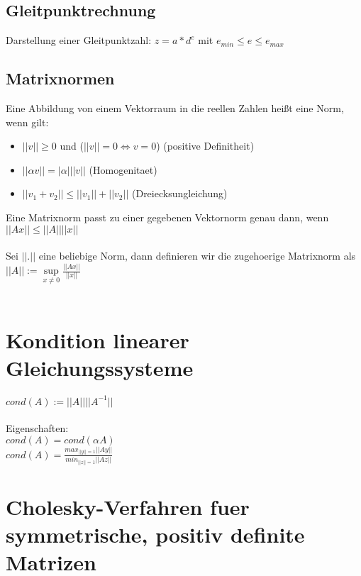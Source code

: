 \documentclass[a4paper]{scrreprt}
\begin{document}
\subsection{Gleitpunktrechnung}

Darstellung einer Gleitpunktzahl: $z = a * d^e$ mit $e_{min} \leq e \leq e_{max}$

\subsection{Matrixnormen}

Eine Abbildung von einem Vektorraum in die reellen Zahlen heißt eine Norm, wenn gilt:
\begin{itemize}
	\item $||v|| \geq 0$ und ($||v|| = 0 \Leftrightarrow v = 0$) (positive Definitheit)
	\item $||\alpha v|| = |\alpha|||v||$ (Homogenitaet)
	\item $||v_1 + v_2|| \leq ||v_1|| + ||v_2||$ (Dreiecksungleichung)
\end{itemize}

Eine Matrixnorm passt zu einer gegebenen Vektornorm genau dann, wenn\\
$||Ax|| \leq ||A||||x||$\\\\

Sei $||.||$ eine beliebige Norm, dann definieren wir die zugehoerige Matrixnorm als\\
$||A|| := \sup\limits_{x \neq 0}\frac{||Ax||}{||x||}$\\\\

\section{Kondition linearer Gleichungssysteme}

$cond(A) := ||A||||A^{-1}||$\\\\

Eigenschaften:\\
$cond(A) = cond(\alpha A)$\\
$cond(A) = \frac{max_{||y|| = 1}||Ay||}{min_{||z|| = 1}||Az||}$

\section{Cholesky-Verfahren fuer symmetrische, positiv definite Matrizen}
\end{document}
